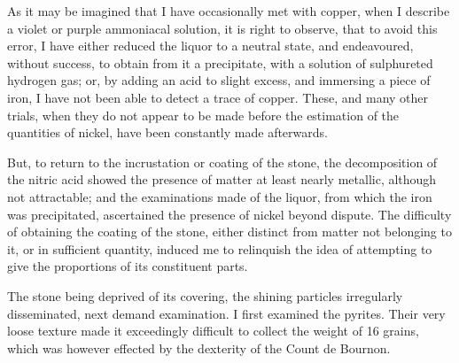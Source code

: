 \documentclass[a4paper, 12pt, oneside, twocolumn]{article}
\begin{document}
As it may be imagined that I have occasionally met with copper, when I describe a violet or purple ammoniacal solution, it is right to observe, that to avoid this error, I have either reduced the liquor to a neutral state, and endeavoured, without success, to obtain from it a precipitate, with a solution of sulphureted hydrogen gas; or, by adding an acid to slight excess, and immersing a piece of iron, I have not been able to detect a trace of copper. These, and many other trials, when they do not appear to be made before the estimation of the quantities of nickel, have been constantly made afterwards.

But, to return to the incrustation or coating of the stone, the decomposition of the nitric acid showed the presence of matter at least nearly metallic, although not attractable; and the examinations made of the liquor, from which the iron was precipitated, ascertained the presence of nickel beyond dispute. The difficulty of obtaining the coating of the stone, either distinct from matter not belonging to it, or in sufficient quantity, induced me to relinquish the idea of attempting to give the proportions of its constituent parts.

The stone being deprived of its covering, the shining particles irregularly disseminated, next demand examination. I first examined the pyrites. Their very loose texture made it exceedingly difficult to collect the weight of 16 grains, which was however effected by the dexterity of the Count de Bournon.
\end{document}
